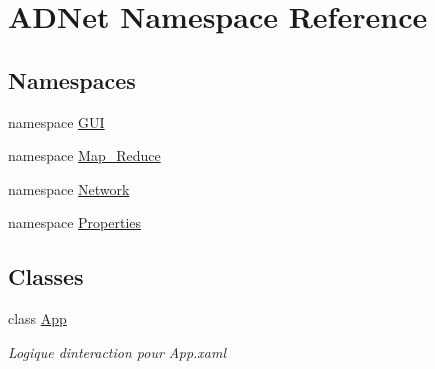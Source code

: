 \hypertarget{namespace_a_d_net}{}\section{A\+D\+Net Namespace Reference}
\label{namespace_a_d_net}
\subsection*{Namespaces}
\begin{DoxyCompactItemize}
\item 
namespace \hyperlink{namespace_a_d_net_1_1_g_u_i}{G\+UI}
\item 
namespace \hyperlink{namespace_a_d_net_1_1_map___reduce}{Map\+\_\+\+Reduce}
\item 
namespace \hyperlink{namespace_a_d_net_1_1_network}{Network}
\item 
namespace \hyperlink{namespace_a_d_net_1_1_properties}{Properties}
\end{DoxyCompactItemize}
\subsection*{Classes}
\begin{DoxyCompactItemize}
\item 
class \hyperlink{class_a_d_net_1_1_app}{App}
\begin{DoxyCompactList}\small\item\em Logique d\textquotesingle{}interaction pour App.\+xaml \end{DoxyCompactList}\end{DoxyCompactItemize}
